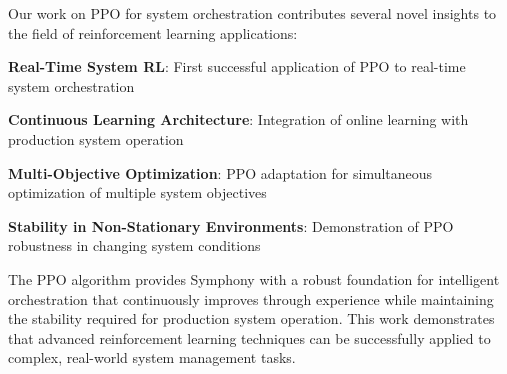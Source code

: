 Our work on PPO for system orchestration contributes several novel insights to the field of reinforcement learning applications:

\begin{expandedlist}
    \item \textbf{Real-Time System RL}: First successful application of PPO to real-time system orchestration
    \item \textbf{Continuous Learning Architecture}: Integration of online learning with production system operation
    \item \textbf{Multi-Objective Optimization}: PPO adaptation for simultaneous optimization of multiple system objectives
    \item \textbf{Stability in Non-Stationary Environments}: Demonstration of PPO robustness in changing system conditions
\end{expandedlist}

The PPO algorithm provides Symphony with a robust foundation for intelligent orchestration that continuously improves through experience while maintaining the stability required for production system operation. This work demonstrates that advanced reinforcement learning techniques can be successfully applied to complex, real-world system management tasks.
